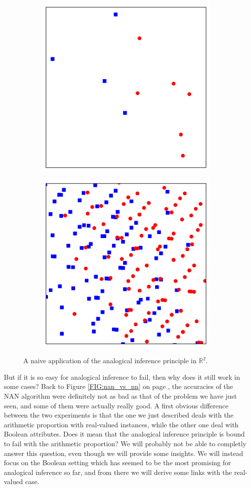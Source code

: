 \begin{figure}
\centering
\begin{subfigure}{.5\textwidth}
  \centering
  \includegraphics[width=.6\linewidth]{figures/AE_in_R2_S.pdf}
  \label{fig:sub1}
\end{subfigure}%
\begin{subfigure}{.5\textwidth}
  \centering
  \includegraphics[width=.6\linewidth]{figures/AE_in_R2_AE.pdf}
  \label{fig:sub2}
\end{subfigure}
  \caption{A naive application of the analogical inference principle in
  $\mathbb{R}^2$.}
\label{FIG:classif_in_R2}
\end{figure}

But if it is so easy for analogical inference to fail, then why does it still
work in some cases? Back to Figure \ref{FIG:nan_vs_nn} on page
\pageref{FIG:nan_vs_nn}, the accuracies of the NAN algorithm were definitely
not as bad as that of the problem we have just seen, and some of them were
actually really good. A first obvious difference between the two experiments is
that the one we just described deals with the arithmetic proportion with
real-valued instances, while the other one deal with Boolean attributes. Does
it mean that the analogical inference principle is bound to fail with the
arithmetic proportion? We will probably not be able to completly answer this
question, even though we will provide some insights.  We will instead focus on
the Boolean setting which has seemed to be the most promising for analogical
inference so far, and from there we will derive some links with the real-valued
case.

